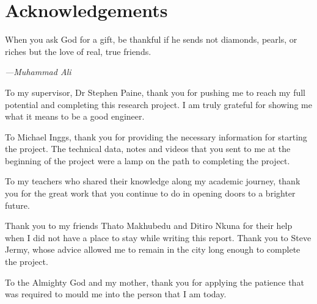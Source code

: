 \documentclass[class=report,11pt,crop=false]{standalone}
\begin{document}
\chapter*{Acknowledgements}
\epigraph{When you ask God for a gift, be thankful if he sends not diamonds, pearls, or riches but the love of real, true friends.}%
    {\emph{---Muhammad Ali}}
\vspace{0.3cm}

To my supervisor, Dr Stephen Paine, thank you for pushing me to reach my full potential and completing this research project. I am truly grateful for showing me what it means to be a good engineer. 

To Michael Inggs, thank you for providing the necessary information for starting the project. The technical data, notes and videos that you sent to me at the beginning of the project were a lamp on the path to completing the project.

To my teachers who shared their knowledge along my academic journey, thank you for the great work that you continue to do in opening doors to a brighter future. 

Thank you to my friends Thato Makhubedu and Ditiro Nkuna for their help when I did not have a place to stay while writing this report. Thank you to Steve Jermy, whose advice allowed me to remain in the city long enough to complete the project.

To the Almighty God and my mother, thank you for applying the patience that was required to mould me into the person that I am today. 
\end{document}
